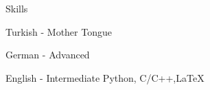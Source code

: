 
\begin{rubric}{Skills}
\entry*[Languages]


Turkish - Mother Tongue

	German - Advanced

    English - Intermediate
    Python, C/C++,LaTeX
\end{rubric}
